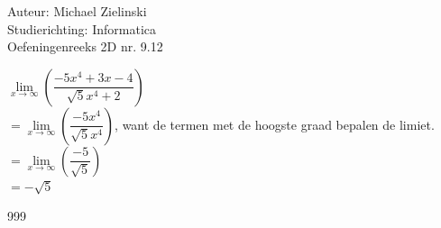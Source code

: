 \documentclass[a4paper]{article}
\begin{document}
  
\noindent \large Auteur: Michael Zielinski \\
\noindent \large Studierichting: Informatica\\
\noindent \large Oefeningenreeks 2D nr. 9.12\\
\medskip
\normalsize

$\lim\limits_{x\rightarrow\infty} \left(\dfrac{-5x^4+3x-4}{\sqrt{5}x^4+2}\right)$ \\

$= \lim\limits_{x\rightarrow\infty} \left(\dfrac{-5x^4}{\sqrt{5}x^4}\right)$, want de termen met de hoogste graad bepalen de limiet. \\

$= \lim\limits_{x\rightarrow\infty} \left(\dfrac{-5}{\sqrt{5}}\right)$ \\

$= -\sqrt{5}$ \\

\begin{thebibliography}{999}
\end{thebibliography}
\end{document}
